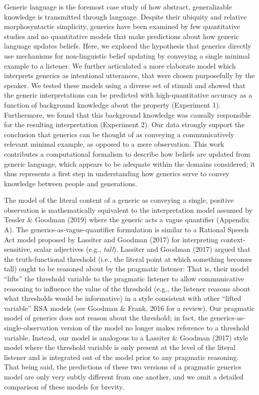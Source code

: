 \documentclass[floatsintext,doc]{apa6}
\begin{document}
Generic language is the foremost case study of how abstract, generalizable knowledge is transmitted through language.
Despite their ubiquity and relative morphosyntactic simplicity, generics have been examined by few quantitative studies and no quantitative models that make predictions about how generic language updates beliefs.
Here, we explored the hypothesis that generics directly use mechanisms for non-linguistic belief updating by conveying a single minimal example to a listener. 
We further articulated a more elaborate model which interprets generics as intentional utterances, that were chosen purposefully by the speaker.
We tested these models using a diverse set of stimuli and showed that the generic interpretations can be predicted with high-quantitative accuracy as a function of background knowledge about the property (Experiment 1).
Furthermore, we found that this background knowledge was causally responsible for the resulting interpretation (Experiment 2).
Our data strongly support the conclusion that generics can be thought of as conveying a communicatively relevant minimal example, as opposed to a mere observation. 
This work contributes a computational formalism to describe how beliefs are updated from generic language, which appears to be adequate within the domains considered; it thus represents a first step in understanding how generics serve to convey knowledge between people and generations.


The model of the literal content of a generic as conveying a single, positive observation is mathematically equivalent to the interpretation model assumed by Tessler \& Goodman (2019) where the generic acts a vague quantifier (Appendix A). 
The generics-as-vague-quantifier formulation is similar to a Rational Speech Act model proposed by Lassiter and Goodman (2017) for interpreting context-sensitive, scalar adjectives (e.g., \emph{tall}).
Lassiter and Goodman (2017) argued that the truth-functional threshold (i.e., the literal point at which something becomes tall) ought to be reasoned about by the pragmatic listener: That is, their model ``lifts'' the threshold variable to the pragmatic listener to allow communicative reasoning to influence the value of the threshold (e.g., the listener reasons about what thresholds would be informative) in a style consistent with other ``lifted variable'' RSA models (see Goodman \& Frank, 2016 for a review). 
Our pragmatic model of generics does not reason about the threshold; in fact, the generics-as-single-observation version of the model no longer makes reference to a threshold variable. 
Instead, our model is analogous to a Lassiter \& Goodman (2017) style model where the threshold variable is only present at the level of the literal listener and is integrated out of the model prior to any pragmatic reasoning. 
That being said, the predictions of these two versions of a pragmatic generics model are only very subtly different from one another, and we omit a detailed comparison of these models for brevity. 
\end{document}
